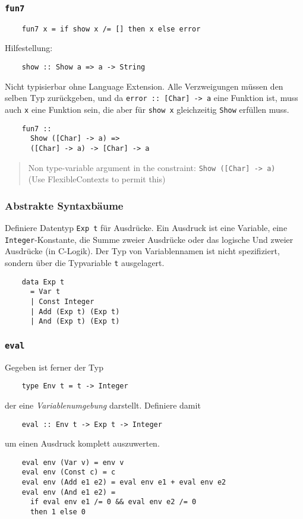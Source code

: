 \documentclass{beamer}
\begin{document}
\begin{frame}[fragile]
  \frametitle{\lstinline{fun7}}
  \begin{lstlisting}
    fun7 x = if show x /= [] then x else error
  \end{lstlisting}
  \pause
  Hilfestellung:
  \begin{lstlisting}
    show :: Show a => a -> String
  \end{lstlisting}
  \pause
  Nicht typisierbar ohne Language Extension.
  Alle Verzweigungen müssen den selben Typ zurückgeben,
  und da \lstinline{error :: [Char] -> a} eine Funktion ist,
  muss auch \lstinline{x} eine Funktion sein,
  die aber für \lstinline{show x} gleichzeitig \lstinline{Show} erfüllen muss.
  \begin{lstlisting}
    fun7 ::
      Show ([Char] -> a) =>
      ([Char] -> a) -> [Char] -> a
  \end{lstlisting}
  \begin{quote}
    Non type-variable argument in the constraint: \lstinline{Show ([Char] -> a)} \\
    (Use FlexibleContexts to permit this)
  \end{quote}
\end{frame}

\begin{frame}[fragile]
  \frametitle{Abstrakte Syntaxbäume}
  Definiere Datentyp \lstinline{Exp t} für Ausdrücke.
  Ein Ausdruck ist eine Variable, eine \lstinline{Integer}-Konstante, die Summe zweier Ausdrücke oder das logische Und zweier Ausdrücke (in C-Logik).
  Der Typ von Variablennamen ist nicht spezifiziert, sondern über die Typvariable \lstinline{t} ausgelagert.
  \pause
  \begin{lstlisting}
    data Exp t
      = Var t
      | Const Integer
      | Add (Exp t) (Exp t)
      | And (Exp t) (Exp t)
  \end{lstlisting}
\end{frame}

\begin{frame}[fragile]
  \frametitle{\lstinline{eval}}
  Gegeben ist ferner der Typ
  \begin{lstlisting}
    type Env t = t -> Integer
  \end{lstlisting}
  der eine \emph{Variablenumgebung} darstellt.
  Definiere damit
  \begin{lstlisting}
    eval :: Env t -> Exp t -> Integer
  \end{lstlisting}
  um einen Ausdruck komplett auszuwerten.
  \pause
  \begin{lstlisting}
    eval env (Var v) = env v
    eval env (Const c) = c
    eval env (Add e1 e2) = eval env e1 + eval env e2
    eval env (And e1 e2) =
      if eval env e1 /= 0 && eval env e2 /= 0
      then 1 else 0
  \end{lstlisting}
\end{frame}
\end{document}
